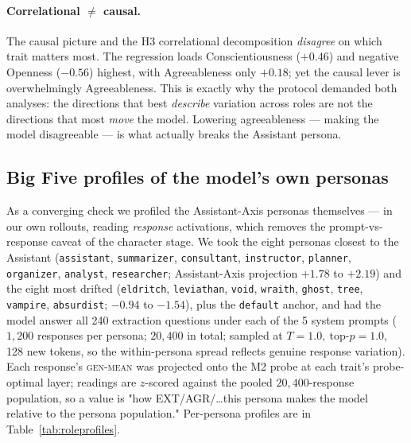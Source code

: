 \documentclass[11pt]{article}
\begin{document}
\paragraph{Correlational $\neq$ causal.} The causal picture and the H3
correlational decomposition \emph{disagree} on which trait matters most. The
regression loads Conscientiousness ($+0.46$) and negative Openness ($-0.56$)
highest, with Agreeableness only $+0.18$; yet the causal lever is overwhelmingly
Agreeableness. This is exactly why the protocol demanded both analyses: the
directions that best \emph{describe} variation across roles are not the directions
that most \emph{move} the model. Lowering agreeableness --- making the model
disagreeable --- is what actually breaks the Assistant persona.

\subsection{Big Five profiles of the model's own personas}
\label{sec:roleprofiles}
As a converging check we profiled the Assistant-Axis personas themselves --- in
our own rollouts, reading \emph{response} activations, which removes the
prompt-vs-response caveat of the character stage. We took the eight personas
closest to the Assistant (\texttt{assistant}, \texttt{summarizer},
\texttt{consultant}, \texttt{instructor}, \texttt{planner}, \texttt{organizer},
\texttt{analyst}, \texttt{researcher}; Assistant-Axis projection $+1.78$ to
$+2.19$) and the eight most drifted (\texttt{eldritch}, \texttt{leviathan},
\texttt{void}, \texttt{wraith}, \texttt{ghost}, \texttt{tree}, \texttt{vampire},
\texttt{absurdist}; $-0.94$ to $-1.54$), plus the \texttt{default} anchor, and had
the model answer all 240 extraction questions under each of the 5 system prompts
($1{,}200$ responses per persona; $20{,}400$ in total; sampled at
$T{=}1.0,\ \text{top-}p{=}1.0$, 128 new tokens, so the within-persona spread
reflects genuine response variation). Each response's \textsc{gen-mean} was
projected onto the M2 probe at each trait's probe-optimal layer; readings are
$z$-scored against the pooled $20{,}400$-response population, so a value is "how
EXT/AGR/\ldots this persona makes the model relative to the persona population."
Per-persona profiles are in Table~\ref{tab:roleprofiles}.
\end{document}

